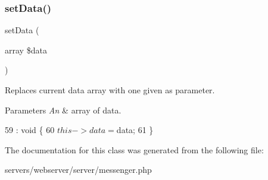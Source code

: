 \subsubsection{\texorpdfstring{set\+Data()}{setData()}}
{\footnotesize\ttfamily set\+Data (\begin{DoxyParamCaption}\item[{array}]{\$data }\end{DoxyParamCaption})}

Replaces current data array with one given as parameter. 
\begin{DoxyParams}{Parameters}
{\em An} & array of data. \\
\hline
\end{DoxyParams}

\begin{DoxyCode}
59                                           : \textcolor{keywordtype}{void} \{
60         $this->data = $data;
61     \}
\end{DoxyCode}


The documentation for this class was generated from the following file\+:\begin{DoxyCompactItemize}
\item 
servers/webserver/server/messenger.\+php\end{DoxyCompactItemize}
